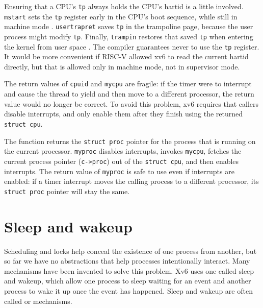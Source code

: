 Ensuring that a CPU's \lstinline{tp} always holds the CPU's
hartid is a little involved. \lstinline{mstart} sets the \lstinline{tp}
register early in the CPU's boot sequence, while still in machine mode
.
\lstinline{usertrapret} saves \lstinline{tp} in the trampoline
page, because the user process might modify \lstinline{tp}.
Finally, \lstinline{trampin} restores that saved \lstinline{tp}
when entering the kernel from user space
.
The compiler guarantees never to use the \lstinline{tp}
register.
It would be more convenient if RISC-V allowed xv6 to read the
current hartid directly, but that is allowed only in
machine mode, not in supervisor mode.

The return values of
\lstinline{cpuid}
and
\lstinline{mycpu}
are fragile: if the timer were to interrupt and cause
the thread to yield and then move to a different processor, the
return value would no longer be correct.
To avoid this problem, xv6 requires that callers 
disable interrupts, and only enable
them after they finish using the returned
\lstinline{struct cpu}.

The function
returns the
\lstinline{struct proc}
pointer
for the process that is running on the current processor.
\lstinline{myproc}
disables interrupts, invokes
\lstinline{mycpu},
fetches the current process pointer
(\lstinline{c->proc})
out of the
\lstinline{struct cpu},
and then enables interrupts.
The return value of
\lstinline{myproc}
is safe to use even if interrupts are enabled:
if a timer interrupt moves the calling process to a
different processor, its
\lstinline{struct proc}
pointer will stay the same.
\section{Sleep and wakeup}

Scheduling and locks help conceal the existence of one process
from another,
but so far we have no abstractions that help
processes intentionally interact.
Many mechanisms have been invented to solve this problem.
Xv6 uses one called sleep and wakeup, which allow one process to
sleep waiting for an event and another process to wake it up
once the event has happened.
Sleep and wakeup are often called 
or 
mechanisms.

